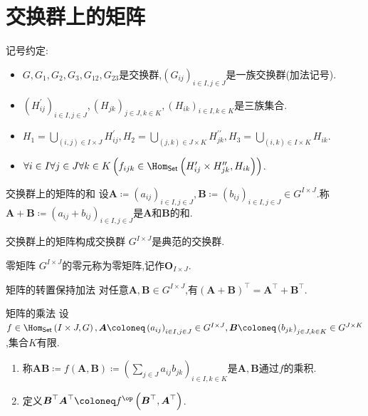 \section{交换群上的矩阵}

记号约定:

\begin{itemize}
	\item $G,G_{1},G_{2},G_{3},G_{12},G_{23}$是交换群,$\left(G_{ij}\right)_{i\in I,j\in J}$是一族交换群(加法记号).
	\item $\left(H_{ij}^{\prime}\right)_{i\in I,j\in J},\left(H_{jk}\right)_{j\in J,k\in K},\left(H_{ik}\right)_{i\in I,k\in K}$是三族集合.
	\item $H_{1}=\bigcup\limits_{\left(i,j\right)\in I\times J}H_{ij}^{\prime},H_{2}=\bigcup\limits_{\left(j,k\right)\in J\times K}H_{jk}^{\prime\prime},H_{3}=\bigcup\limits_{\left(i,k\right)\in I\times K}H_{ik}$.
	\item $\forall i\in I\forall j\in J\forall k\in K\left(f_{ijk}\in\Hom_{\mathsf{Set}}\left(H_{ij}^{\prime}\times H_{jk}^{\prime\prime},H_{ik}\right)\right)$.
\end{itemize}

\begin{definition}{交换群上的矩阵的和}{}
	设$\boldsymbol{A}\coloneq\left(a_{ij}\right)_{i\in I,j\in J},\boldsymbol{B}\coloneq\left(b_{ij}\right)_{i\in I,j\in J}\in G^{I\times J}$.称$\boldsymbol{A}+\boldsymbol{B}\coloneq\left(a_{ij}+b_{ij}\right)_{i\in I,j\in J}$是$\boldsymbol{A}$和$\boldsymbol{B}$的和.
\end{definition}

\begin{proposition}{交换群上的矩阵构成交换群}{}
	$G^{I\times J}$是典范的交换群.
\end{proposition}

\begin{definition}{零矩阵}{}
	$G^{I\times J}$的零元称为零矩阵,记作$\boldsymbol{O}_{I\times J}$.
\end{definition}

\begin{proposition}{矩阵的转置保持加法}{}
	对任意$\boldsymbol{A},\boldsymbol{B}\in G^{I\times J}$,有$\left(\boldsymbol{A}+\boldsymbol{B}\right)^{\top}=\boldsymbol{A}^{\top}+\boldsymbol{B}^{\top}$.
\end{proposition}

\begin{definition}{矩阵的乘法}{}
	设$f\in\Hom_{\mathsf{Set}}\left(I\times J,G\right),\boldsymbol{A}\coloneq\left(a_{ij}\right)_{i\in I,j\in J}\in G^{I\times J},\boldsymbol{B}\coloneq\left(b_{jk}\right)_{j\in J,k\in K}\in G^{J\times K}$,集合$K$有限.
	\begin{enumerate}
		\item 称$\boldsymbol{A}\boldsymbol{B}\coloneq f\left(\boldsymbol{A},\boldsymbol{B}\right)\coloneq\left(\sum\limits_{j\in J}a_{ij}b_{jk}\right)_{i\in I,k\in K}$是$\boldsymbol{A},\boldsymbol{B}$通过$f$的乘积.
		\item 定义$\boldsymbol{B}^{\top}\boldsymbol{A}^{\top}\coloneq f^{\op}\left(\boldsymbol{B}^{\top},\boldsymbol{A}^{\top}\right)$.
	\end{enumerate}
\end{definition}

